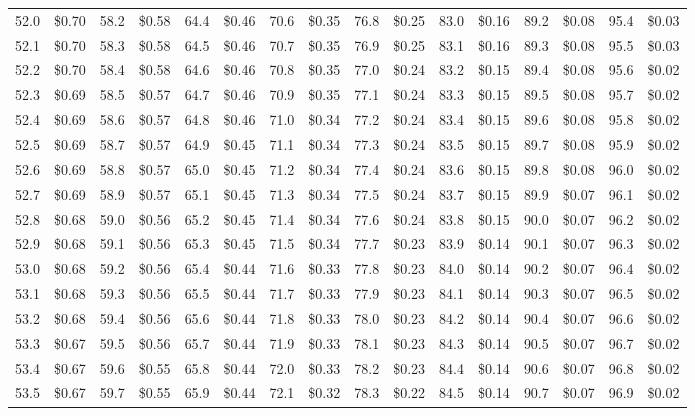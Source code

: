 \documentclass{article}
\begin{document}
\begin{tabular}{|*{8}{rr|}}
52.0 & \$0.70 & 58.2 & \$0.58 & 64.4 & \$0.46 & 70.6 & \$0.35 & 76.8 & \$0.25 & 83.0 & \$0.16 & 89.2 & \$0.08 & 95.4 & \$0.03\\
52.1 & \$0.70 & 58.3 & \$0.58 & 64.5 & \$0.46 & 70.7 & \$0.35 & 76.9 & \$0.25 & 83.1 & \$0.16 & 89.3 & \$0.08 & 95.5 & \$0.03\\
52.2 & \$0.70 & 58.4 & \$0.58 & 64.6 & \$0.46 & 70.8 & \$0.35 & 77.0 & \$0.24 & 83.2 & \$0.15 & 89.4 & \$0.08 & 95.6 & \$0.02\\
52.3 & \$0.69 & 58.5 & \$0.57 & 64.7 & \$0.46 & 70.9 & \$0.35 & 77.1 & \$0.24 & 83.3 & \$0.15 & 89.5 & \$0.08 & 95.7 & \$0.02\\
52.4 & \$0.69 & 58.6 & \$0.57 & 64.8 & \$0.46 & 71.0 & \$0.34 & 77.2 & \$0.24 & 83.4 & \$0.15 & 89.6 & \$0.08 & 95.8 & \$0.02\\
52.5 & \$0.69 & 58.7 & \$0.57 & 64.9 & \$0.45 & 71.1 & \$0.34 & 77.3 & \$0.24 & 83.5 & \$0.15 & 89.7 & \$0.08 & 95.9 & \$0.02\\
52.6 & \$0.69 & 58.8 & \$0.57 & 65.0 & \$0.45 & 71.2 & \$0.34 & 77.4 & \$0.24 & 83.6 & \$0.15 & 89.8 & \$0.08 & 96.0 & \$0.02\\
52.7 & \$0.69 & 58.9 & \$0.57 & 65.1 & \$0.45 & 71.3 & \$0.34 & 77.5 & \$0.24 & 83.7 & \$0.15 & 89.9 & \$0.07 & 96.1 & \$0.02\\
52.8 & \$0.68 & 59.0 & \$0.56 & 65.2 & \$0.45 & 71.4 & \$0.34 & 77.6 & \$0.24 & 83.8 & \$0.15 & 90.0 & \$0.07 & 96.2 & \$0.02\\
52.9 & \$0.68 & 59.1 & \$0.56 & 65.3 & \$0.45 & 71.5 & \$0.34 & 77.7 & \$0.23 & 83.9 & \$0.14 & 90.1 & \$0.07 & 96.3 & \$0.02\\
53.0 & \$0.68 & 59.2 & \$0.56 & 65.4 & \$0.44 & 71.6 & \$0.33 & 77.8 & \$0.23 & 84.0 & \$0.14 & 90.2 & \$0.07 & 96.4 & \$0.02\\
53.1 & \$0.68 & 59.3 & \$0.56 & 65.5 & \$0.44 & 71.7 & \$0.33 & 77.9 & \$0.23 & 84.1 & \$0.14 & 90.3 & \$0.07 & 96.5 & \$0.02\\
53.2 & \$0.68 & 59.4 & \$0.56 & 65.6 & \$0.44 & 71.8 & \$0.33 & 78.0 & \$0.23 & 84.2 & \$0.14 & 90.4 & \$0.07 & 96.6 & \$0.02\\
53.3 & \$0.67 & 59.5 & \$0.56 & 65.7 & \$0.44 & 71.9 & \$0.33 & 78.1 & \$0.23 & 84.3 & \$0.14 & 90.5 & \$0.07 & 96.7 & \$0.02\\
53.4 & \$0.67 & 59.6 & \$0.55 & 65.8 & \$0.44 & 72.0 & \$0.33 & 78.2 & \$0.23 & 84.4 & \$0.14 & 90.6 & \$0.07 & 96.8 & \$0.02\\
53.5 & \$0.67 & 59.7 & \$0.55 & 65.9 & \$0.44 & 72.1 & \$0.32 & 78.3 & \$0.22 & 84.5 & \$0.14 & 90.7 & \$0.07 & 96.9 & \$0.02\\

\end{tabular}
\end{document}
